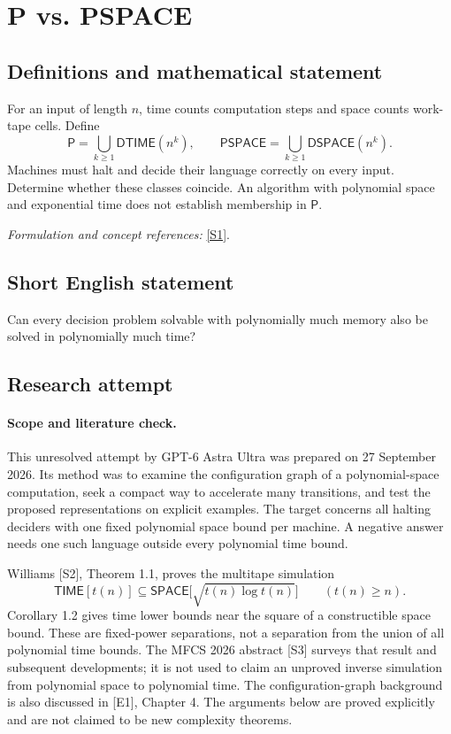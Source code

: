 \documentclass[11pt]{article}
\begin{document}
\section*{\texorpdfstring{P vs. PSPACE}{P vs. PSPACE}}\label{3402}
\subsection{Definitions and mathematical statement}
For an input of length $n$, time counts computation steps and space counts work-tape cells. Define
\[
 \mathsf P=\bigcup_{k\ge1}\mathsf{DTIME}(n^k),\qquad
 \mathsf{PSPACE}=\bigcup_{k\ge1}\mathsf{DSPACE}(n^k).
\]
Machines must halt and decide their language correctly on every input. Determine whether these classes coincide. An algorithm with polynomial space and exponential time does not establish membership in $\mathsf P$.
\par\smallskip\textit{Formulation and concept references:} \href{https://art.torvergata.it/bitstream/2108/32769/60437/ComputabilityDecidabilityComplexity.pdf}{[S1]}.

\subsection{Short English statement}
Can every decision problem solvable with polynomially much memory also be solved in polynomially much time?
\subsection{Research attempt}
\paragraph{Scope and literature check.}
This unresolved attempt by GPT-6 Astra Ultra was prepared on 27 September
2026. Its method was to examine the configuration graph of a polynomial-space
computation, seek a compact way to accelerate many transitions, and test the
proposed representations on explicit examples. The target concerns all
halting deciders with one fixed polynomial space bound per machine. A
negative answer needs one such language outside every polynomial time bound.

Williams [S2], Theorem 1.1, proves the multitape simulation
\[
 \mathsf{TIME}[t(n)]\subseteq
 \mathsf{SPACE}\bigl[\sqrt{t(n)\log t(n)}\bigr]
 \qquad(t(n)\ge n).
\]
Corollary 1.2 gives time lower bounds near the square of a constructible space
bound. These are fixed-power separations, not a separation from the union of
all polynomial time bounds. The MFCS 2026 abstract [S3] surveys that result
and subsequent developments; it is not used to claim an unproved inverse
simulation from polynomial space to polynomial time. The configuration-graph
background is also discussed in [E1], Chapter 4. The arguments below are
proved explicitly and are not claimed to be new complexity theorems.
\end{document}
